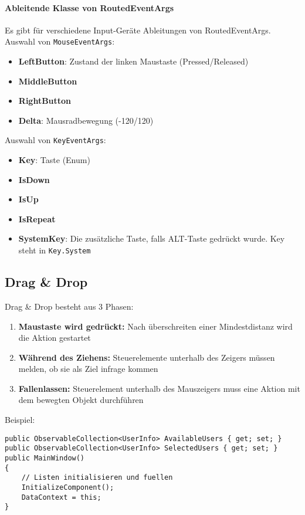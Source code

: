 \paragraph{Ableitende Klasse von RoutedEventArgs} Es gibt für verschiedene Input-Geräte Ableitungen von RoutedEventArgs. Auswahl von \verb+MouseEventArgs+:
\begin{itemize}
\item \textbf{LeftButton}: Zustand der linken Maustaste (Pressed/Released)
\item \textbf{MiddleButton}
\item \textbf{RightButton}
\item \textbf{Delta}: Mausradbewegung (-120/120)
\end{itemize}
Auswahl von \verb+KeyEventArgs+:
\begin{itemize}
\item \textbf{Key}: Taste (Enum)
\item \textbf{IsDown}
\item \textbf{IsUp}
\item \textbf{IsRepeat}
\item \textbf{SystemKey}: Die zusätzliche Taste, falls ALT-Taste gedrückt wurde. Key steht in \verb+Key.System+
\end{itemize}
\subsection{Drag \& Drop}
Drag \& Drop besteht aus 3 Phasen:
\begin{enumerate}
\item \textbf{Maustaste wird gedrückt:} Nach überschreiten einer Mindestdistanz wird die Aktion gestartet
\item \textbf{Während des Ziehens:} Steuerelemente unterhalb des Zeigers müssen melden, ob sie als Ziel infrage kommen
\item \textbf{Fallenlassen:} Steuerelement unterhalb des Mauszeigers muss eine Aktion mit dem bewegten Objekt durchführen
\end{enumerate}
Beispiel:
\begin{lstlisting}
public ObservableCollection<UserInfo> AvailableUsers { get; set; }
public ObservableCollection<UserInfo> SelectedUsers { get; set; }
public MainWindow()
{
    // Listen initialisieren und fuellen
    InitializeComponent();
    DataContext = this;
}
\end{lstlisting}
